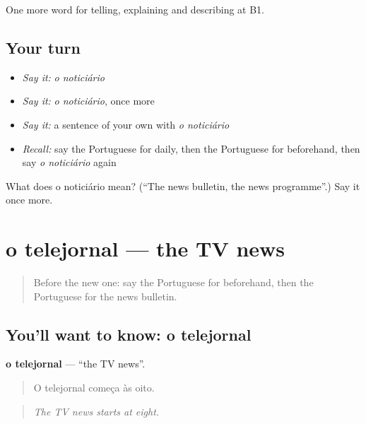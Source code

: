 \begin{grammarlens}[title={What you've built}]
One more word for telling, explaining and describing at B1.
\end{grammarlens}

\subsection*{Your turn}
\begin{itemize}
\raggedright
  \item \emph{Say it:} \emph{o noticiário}
  \item \emph{Say it:} \emph{o noticiário}, once more
  \item \emph{Say it:} a sentence of your own with \emph{o noticiário}
  \item \emph{Recall:} say the Portuguese for daily, then the Portuguese for beforehand, then say \emph{o noticiário} again
\end{itemize}

\begin{tcolorbox}[breakable,colback=teal!4,colframe=teal!35!black,title={Before you move on}]
What does o noticiário mean? (\textquotedblleft{}The news bulletin, the news programme\textquotedblright{}.) Say it once more.
\end{tcolorbox}
\section[o telejornal]{o telejornal — the TV news}

\label{lesson:PT-C278-telejornal}



\begin{quote}
Before the new one: say the Portuguese for beforehand, then the Portuguese for the news bulletin.
\end{quote}

\subsection*{You'll want to know: o telejornal}
\textbf{o telejornal} — \textquotedblleft{}the TV news\textquotedblright{}.

\begin{quote}
O telejornal começa às oito.
\end{quote}

\begin{quote}
\emph{The TV news starts at eight.}
\end{quote}

